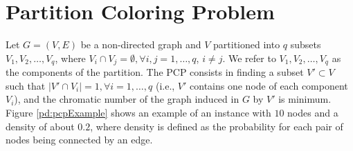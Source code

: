 \section{Partition Coloring Problem}


Let $G = (V, E)$ be a non-directed graph and $V$ partitioned into $q$ subsets $V_1, V_2,\ldots, V_q$, where $V_i \cap V_j = \emptyset, \forall i, j = 1, \ldots , q$, $i \neq j$. We refer to $V_1, V_2, \ldots , V_q$ as the components of the partition. The PCP consists in finding a subset $V' \subset V$ such that $|V' \cap V_i| = 1, \forall i = 1, \ldots , q$ (i.e., $V'$ contains one node of each component $V_i$), and the chromatic number of the graph induced in $G$ by $V'$ is minimum.\\
Figure \ref{pd:pcpExample} shows an example of an instance with $10$ nodes and a density of about $0.2$, where density is defined as the probability for each pair of nodes being connected by an edge.

